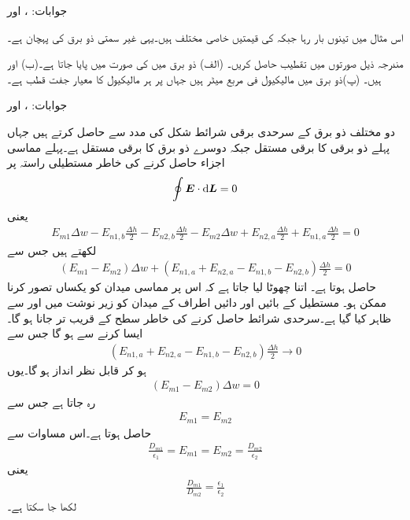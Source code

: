 جوابات: ،  اور 

اس مثال میں تینوں بار  رہا جبکہ  کی قیمتیں خاصی مختلف ہیں۔یہی غیر سمتی ذو برق کی پہچان ہے۔
 
مندرجہ ذیل صورتوں میں تقطیب حاصل کریں۔ (الف) ذو برق میں  کی صورت میں  پایا جاتا ہے۔(ب)  اور  ہیں۔ (پ)ذو برق میں   مالیکیول فی مربع میٹر ہیں جہاں  پر  ہر مالیکیول کا معیار جفت قطب
  ہے۔ 

جوابات: ،  اور 

دو مختلف ذو برق کے سرحدی برقی شرائط شکل  کی مدد سے حاصل کرتے ہیں جہاں پہلے ذو برقی کا برقی مستقل  جبکہ دوسرے ذو برق کا برقی مستقل  ہے۔پہلے مماسی اجزاء حاصل کرنے کی خاطر مستطیلی راستہ  پر
\begin{align*}
\oint \kvec{E} \cdot \dif \kvec{L}=0
\end{align*}
یعنی
\begin{align*}
E_{m1} \Delta w-E_{n1,b}\frac{\Delta h}{2}-E_{n2,b} \frac{\Delta h}{2}-E_{m2}\Delta w+E_{n2,a}\frac{\Delta h}{2}+E_{n1,a} \frac{\Delta h}{2}=0 
\end{align*} 
لکھتے ہیں جس سے
\begin{align*}
(E_{m1} -E_{m2})\Delta w +(E_{n1,a}+E_{n2,a}-E_{n1,b}-E_{n2,b})\frac{\Delta h}{2}=0
\end{align*} 
حاصل ہوتا ہے۔ اتنا چھوٹا لیا جاتا ہے کہ اس پر مماسی میدان کو یکساں تصور کرنا ممکن ہو۔ مستطیل کے بائیں اور دائیں اطراف کے میدان کو زیر نوشت میں  اور  سے ظاہر کیا گیا ہے۔سرحدی شرائط حاصل کرنے کی خاطر سطح کے قریب تر جانا ہو گا۔ایسا کرنے سے  ہو گا جس سے
\begin{align*}
(E_{n1,a}+E_{n2,a}-E_{n1,b}-E_{n2,b})\frac{\Delta h}{2} \to 0
\end{align*} 
ہو کر قابل نظر انداز ہو گا۔یوں
\begin{align*}
(E_{m1} -E_{m2})\Delta w =0
\end{align*} 
رہ جاتا ہے جس سے 
\begin{align}\label{مساوات_کپیسٹر_دو_ذو_برق_سرحدی_شرائط_الف}
E_{m1} =E_{m2}
\end{align} 
حاصل ہوتا ہے۔اس مساوات سے
\begin{align*}
\frac{D_{m1}}{\epsilon_1}=E_{m1}=E_{m2}=\frac{D_{m2}}{\epsilon_2}
\end{align*}
یعنی
\begin{align}\label{مساوات_کپیسٹر_دو_ذو_برق_سرحدی_شرائط_ب}
\frac{D_{m1}}{D_{m2}}=\frac{\epsilon_1}{\epsilon_2}
\end{align}
لکھا جا سکتا ہے۔

